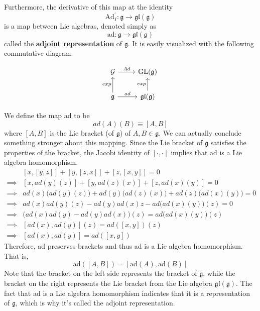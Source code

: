   \begin{definition}
    Furthermore, the derivative of this map at the identity 
    \begin{equation}
      \text{Ad}_I^\prime: \mathfrak{g} \rightarrow \mathfrak{gl}(\mathfrak{g})
    \end{equation}
    is a map between Lie algebras, denoted simply as 
    \begin{equation}
      \text{ad}: \mathfrak{g} \rightarrow \mathfrak{gl}(\mathfrak{g})
    \end{equation}
    called the \textbf{adjoint representation} of $\mathfrak{g}$. It is easily visualized with the following commutative diagram. 

    \[\begin{tikzcd}
    \mathcal{G} \arrow{r}{Ad} & \GL(\mathfrak{g}) \\
    \mathfrak{g} \arrow{u}{exp} \arrow{r}{ad} & \mathfrak{gl}(\mathfrak{g}) \arrow{u}{exp}
    \end{tikzcd}\]

    We define the map ad to be 
    \begin{equation}
      ad(A)(B) \equiv [A,B]
    \end{equation}
    where $[A,B]$ is the Lie bracket (of $\mathfrak{g}$) of $A, B \in \mathfrak{g}$. We can actually conclude something stronger about this mapping. Since the Lie bracket of $\mathfrak{g}$ satisfies the properties of the bracket, the Jacobi identity of $[\cdot, \cdot]$ implies that ad is a Lie algebra homomorphism. 
    \begin{align*}
      & [x, [y,z]] + [y,[z,x]] + [z, [x,y]] = 0 \\
      \implies & [x, ad(y)(z)] + [y, ad(z)(x)] + [z, ad(x)(y)] = 0 \\
      \implies & ad(x)\big(ad(y)(z)\big) + ad(y) \big( ad(z)(x)\big) + ad(z) \big(ad(x)(y)\big) = 0 \\
      \implies & ad(x) ad(y) (z) - ad(y) ad(x) z - ad \big(ad(x)(y)\big) (z) = 0 \\
      \implies & \big( ad(x) ad(y) - ad(y) ad(x) \big) (z) = ad\big( ad(x)(y) \big) (z) \\
      \implies & [ad(x), ad(y)] (z) = ad ([x,y]) (z) \\
      \implies & [ad(x), ad(y)] = ad([x,y])
    \end{align*}
    Therefore, ad preserves brackets and thus ad is a Lie algebra homomorphism. That is, 
    \begin{equation}
      \text{ad}([A,B]) = [\text{ad}(A), \text{ad}(B)]
    \end{equation}
    Note that the bracket on the left side represents the bracket of $\mathfrak{g}$, while the bracket on the right represents the Lie bracket from the Lie algebra $\mathfrak{gl}(\mathfrak{g})$. The fact that ad is a Lie algebra homomorphism indicates that it is a representation of $\mathfrak{g}$, which is why it's called the adjoint representation. 
  \end{definition}

